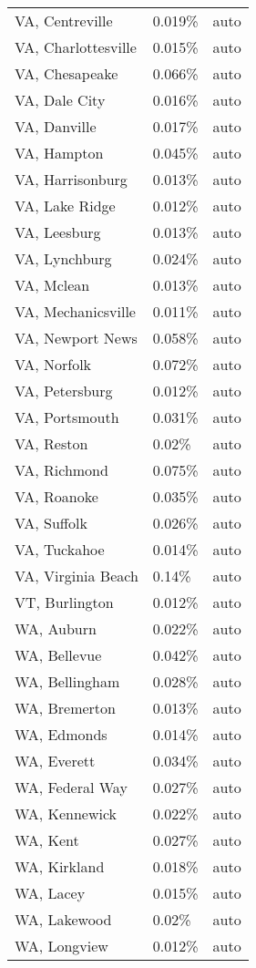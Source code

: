 \begin{longtable}[]{@{}lll@{}}
VA, Centreville & 0.019\% & auto \\
VA, Charlottesville & 0.015\% & auto \\
VA, Chesapeake & 0.066\% & auto \\
VA, Dale City & 0.016\% & auto \\
VA, Danville & 0.017\% & auto \\
VA, Hampton & 0.045\% & auto \\
VA, Harrisonburg & 0.013\% & auto \\
VA, Lake Ridge & 0.012\% & auto \\
VA, Leesburg & 0.013\% & auto \\
VA, Lynchburg & 0.024\% & auto \\
VA, Mclean & 0.013\% & auto \\
VA, Mechanicsville & 0.011\% & auto \\
VA, Newport News & 0.058\% & auto \\
VA, Norfolk & 0.072\% & auto \\
VA, Petersburg & 0.012\% & auto \\
VA, Portsmouth & 0.031\% & auto \\
VA, Reston & 0.02\% & auto \\
VA, Richmond & 0.075\% & auto \\
VA, Roanoke & 0.035\% & auto \\
VA, Suffolk & 0.026\% & auto \\
VA, Tuckahoe & 0.014\% & auto \\
VA, Virginia Beach & 0.14\% & auto \\
VT, Burlington & 0.012\% & auto \\
WA, Auburn & 0.022\% & auto \\
WA, Bellevue & 0.042\% & auto \\
WA, Bellingham & 0.028\% & auto \\
WA, Bremerton & 0.013\% & auto \\
WA, Edmonds & 0.014\% & auto \\
WA, Everett & 0.034\% & auto \\
WA, Federal Way & 0.027\% & auto \\
WA, Kennewick & 0.022\% & auto \\
WA, Kent & 0.027\% & auto \\
WA, Kirkland & 0.018\% & auto \\
WA, Lacey & 0.015\% & auto \\
WA, Lakewood & 0.02\% & auto \\
WA, Longview & 0.012\% & auto \\

\end{longtable}
